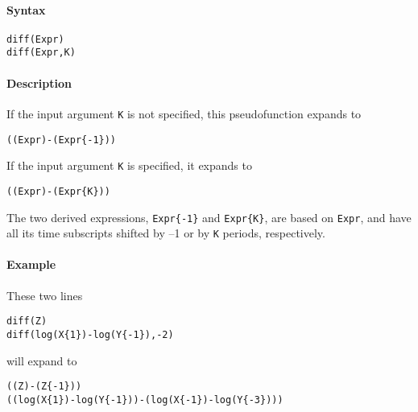 


	\paragraph{Syntax}\label{syntax}

\begin{verbatim}
diff(Expr)
diff(Expr,K)
\end{verbatim}

\paragraph{Description}\label{description}

If the input argument \texttt{K} is not specified, this pseudofunction
expands to

\begin{verbatim}
((Expr)-(Expr{-1}))
\end{verbatim}

If the input argument \texttt{K} is specified, it expands to

\begin{verbatim}
((Expr)-(Expr{K}))
\end{verbatim}

The two derived expressions, \texttt{Expr\{-1\}} and \texttt{Expr\{K\}},
are based on \texttt{Expr}, and have all its time subscripts shifted by
--1 or by \texttt{K} periods, respectively.

\paragraph{Example}\label{example}

These two lines

\begin{verbatim}
diff(Z)
diff(log(X{1})-log(Y{-1}),-2)
\end{verbatim}

will expand to

\begin{verbatim}
((Z)-(Z{-1}))
((log(X{1})-log(Y{-1}))-(log(X{-1})-log(Y{-3})))
\end{verbatim}


